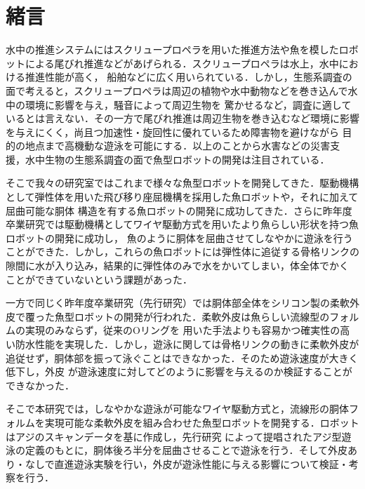 \newpage
\setcounter{page}{1}
\section{緒言}
水中の推進システムにはスクリュープロペラを用いた推進方法や魚を模したロボットによる尾びれ推進などがあげられる\cite{ichi}．スクリュープロペラは水上，水中における推進性能が高く，
船舶などに広く用いられている．しかし，生態系調査の面で考えると，スクリュープロペラは周辺の植物や水中動物などを巻き込んで水中の環境に影響を与え，騒音によって周辺生物を
驚かせるなど，調査に適しているとは言えない．その一方で尾びれ推進は周辺生物を巻き込むなど環境に影響を与えにくく，尚且つ加速性・旋回性に優れているため障害物を避けながら
目的の地点まで高機動な遊泳を可能にする．以上のことから水害などの災害支援，水中生物の生態系調査の面で魚型ロボットの開発は注目されている\cite{ni}\cite{san}．

そこで我々の研究室ではこれまで様々な魚型ロボットを開発してきた．駆動機構として弾性体を用いた飛び移り座屈機構を採用した魚ロボット\cite{yon}\cite{go}や，それに加えて屈曲可能な胴体
構造を有する魚ロボット\cite{roku,nana,hachi}の開発に成功してきた．さらに昨年度卒業研究では駆動機構としてワイヤ駆動方式を用いたより魚らしい形状を持つ魚ロボットの開発に成功し，
魚のように胴体を屈曲させてしなやかに遊泳を行うことができた．しかし，これらの魚ロボットには弾性体に追従する骨格リンクの隙間に水が入り込み，結果的に弾性体のみで水をかいてしまい，体全体でかく
ことができていないという課題があった．

一方で同じく昨年度卒業研究（先行研究\cite{kyu}）では胴体部全体をシリコン製の柔軟外皮で覆った魚型ロボットの開発が行われた．柔軟外皮は魚らしい流線型のフォルムの実現のみならず，従来のOリングを
用いた手法よりも容易かつ確実性の高い防水性能を実現した．しかし，遊泳に関しては骨格リンクの動きに柔軟外皮が追従せず，胴体部を振って泳ぐことはできなかった．そのため遊泳速度が大きく低下し，外皮
が遊泳速度に対してどのように影響を与えるのか検証することができなかった．

そこで本研究では，しなやかな遊泳が可能なワイヤ駆動方式と，流線形の胴体フォルムを実現可能な柔軟外皮を組み合わせた魚型ロボットを開発する．ロボットはアジのスキャンデータを基に作成し，先行研究
\cite{juu}によって提唱されたアジ型遊泳の定義のもとに，胴体後ろ半分を屈曲させることで遊泳を行う．そして外皮あり・なしで直進遊泳実験を行い，外皮が遊泳性能に与える影響について検証・考察を行う．
